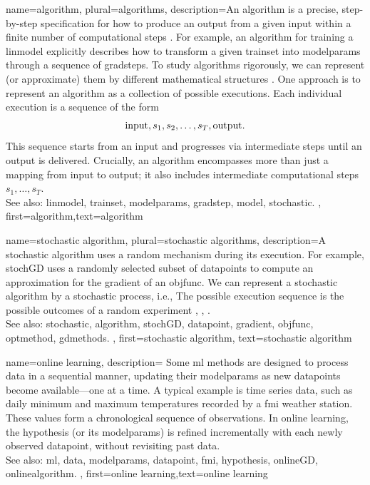 {name={algorithm}, plural={algorithms},
  description={An algorithm is a precise, step-by-step specification for 
  	how to produce an output from a given input within a finite number of computational steps \cite{Cormen:2022aa}. 
    	For example, an algorithm for training a \gls{linmodel} explicitly describes how to 
	transform a given \gls{trainset} into \gls{modelparams} through a sequence of \glspl{gradstep}. 
    	To study algorithms rigorously, we can represent (or approximate) them by different mathematical structures \cite{Sipser2013}. 
     	One approach is to represent an algorithm as a collection of possible executions. Each individual 
     	execution is a sequence of the form $${\rm input},s_1,s_2,\ldots,s_T,{\rm output}.$$ This sequence 
     	starts from an input and progresses via intermediate steps until an output is delivered. Crucially, an algorithm 
     	encompasses more than just a mapping from input to output; it also includes intermediate computational 
     	steps $s_1,\ldots,s_T$.
				\\ 
		See also: \gls{linmodel}, \gls{trainset}, \gls{modelparams}, \gls{gradstep}, \gls{model}, \gls{stochastic}.
	},
	first={algorithm},text={algorithm} 
}

{name={stochastic algorithm}, 
 plural={stochastic algorithms},
	description={A \gls{stochastic} \gls{algorithm} uses a random mechanism 
		during its execution. For example, \gls{stochGD} uses a randomly selected subset of \glspl{datapoint} 
		to compute an approximation for the \gls{gradient} of an \gls{objfunc}. We can represent a 
		\gls{stochastic} \gls{algorithm} by a \gls{stochastic} process, i.e., The possible execution sequence is the possible outcomes of 
		a random experiment \cite{BertsekasProb}, \cite{RandomizedAlgos}, \cite{Gallager13}.		
		\\ 
		See also: \gls{stochastic}, \gls{algorithm}, \gls{stochGD}, \gls{datapoint}, \gls{gradient}, \gls{objfunc}, \gls{optmethod}, \gls{gdmethods}. 
	},
	first={stochastic algorithm},
	text={stochastic algorithm} 
}

{name={online learning},
	description={
		Some \gls{ml} methods  are designed to process \gls{data} in a sequential 
		manner, updating their \gls{modelparams} as new \glspl{datapoint} become available—one at a time. 
		A typical example is time series data, such as daily \gls{minimum} and \gls{maximum} temperatures 
		recorded by a \gls{fmi} weather station. These values form a chronological sequence 
		of observations. In online learning, the \gls{hypothesis} (or its \gls{modelparams}) is refined 
		incrementally with each newly observed \gls{datapoint}, without revisiting past \gls{data}.  \\ 
		See also: \gls{ml}, \gls{data}, \gls{modelparams}, \gls{datapoint}, \gls{fmi}, \gls{hypothesis}, \gls{onlineGD}, \gls{onlinealgorithm}. 
	},
	first={online learning},text={online learning} 
}

